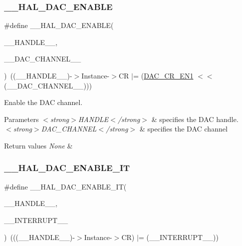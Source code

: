 \subsubsection{\texorpdfstring{\_\_HAL\_DAC\_ENABLE}{\_\_HAL\_DAC\_ENABLE}}
{\footnotesize\ttfamily \#define \+\_\+\+\_\+\+H\+A\+L\+\_\+\+D\+A\+C\+\_\+\+E\+N\+A\+B\+LE(\begin{DoxyParamCaption}\item[{}]{\+\_\+\+\_\+\+H\+A\+N\+D\+L\+E\+\_\+\+\_\+,  }\item[{}]{\+\_\+\+\_\+\+D\+A\+C\+\_\+\+C\+H\+A\+N\+N\+E\+L\+\_\+\+\_\+ }\end{DoxyParamCaption})~((\+\_\+\+\_\+\+H\+A\+N\+D\+L\+E\+\_\+\+\_\+)-\/$>$Instance-\/$>$CR $\vert$=  (\mbox{\hyperlink{group___peripheral___registers___bits___definition_gabd8cedbb3dda03d56ac0ba92d2d9cefd}{D\+A\+C\+\_\+\+C\+R\+\_\+\+E\+N1}} $<$$<$ (\+\_\+\+\_\+\+D\+A\+C\+\_\+\+C\+H\+A\+N\+N\+E\+L\+\_\+\+\_\+)))}



Enable the D\+AC channel. 


\begin{DoxyParams}{Parameters}
{\em $<$strong$>$\+H\+A\+N\+D\+L\+E$<$/strong$>$} & specifies the D\+AC handle. \\
\hline
{\em $<$strong$>$\+D\+A\+C\+\_\+\+C\+H\+A\+N\+N\+E\+L$<$/strong$>$} & specifies the D\+AC channel \\
\hline
\end{DoxyParams}

\begin{DoxyRetVals}{Return values}
{\em None} & \\
\hline
\end{DoxyRetVals}
\mbox{\label{group___d_a_c___exported___macros_gad2d1faa12c460680d8c9f16f7109fb28}} 
\subsubsection{\texorpdfstring{\_\_HAL\_DAC\_ENABLE\_IT}{\_\_HAL\_DAC\_ENABLE\_IT}}
{\footnotesize\ttfamily \#define \+\_\+\+\_\+\+H\+A\+L\+\_\+\+D\+A\+C\+\_\+\+E\+N\+A\+B\+L\+E\+\_\+\+IT(\begin{DoxyParamCaption}\item[{}]{\+\_\+\+\_\+\+H\+A\+N\+D\+L\+E\+\_\+\+\_\+,  }\item[{}]{\+\_\+\+\_\+\+I\+N\+T\+E\+R\+R\+U\+P\+T\+\_\+\+\_\+ }\end{DoxyParamCaption})~(((\+\_\+\+\_\+\+H\+A\+N\+D\+L\+E\+\_\+\+\_\+)-\/$>$Instance-\/$>$CR) $\vert$= (\+\_\+\+\_\+\+I\+N\+T\+E\+R\+R\+U\+P\+T\+\_\+\+\_\+))}



